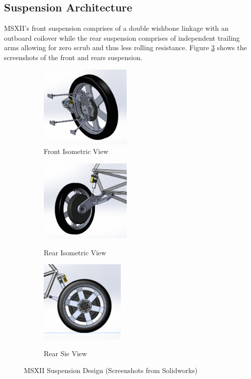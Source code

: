 \documentclass[12pt]{article}
\begin{document}
\subsection{Suspension Architecture}
MSXII's front suspension comprises of a double wishbone linkage with an outboard coilover while the rear suspension comprises of independent trailing arms allowing for zero scrub and thus less rolling resistance. Figure \ref{fig:solidworksScreenshots} shows the screenshots of the front and rears suspension.  
\begin{figure}[htbp]
	\centering
    \begin{subfigure}[b]{.32\textwidth}
		\caption{Front Isometric View}
		\centering
        \includegraphics[height=4cm]{./LaTex/frontIso.PNG}
    \end{subfigure}
    \begin{subfigure}[b]{.32\textwidth}
		\caption{Rear Isometric View}
		\centering
        \includegraphics[height=4cm]{./LaTex/rearIso.PNG}
        \label{fig:c8}
    \end{subfigure}
    \begin{subfigure}[b]{.32\textwidth}
		\caption{Rear Sie View}
		\centering
        \includegraphics[height=4cm]{./LaTex/rearRight.PNG}
        \label{fig:c9}
    \end{subfigure}
    \caption{MSXII Suspension Design (Screenshots from Solidworks)}
	\label{fig:solidworksScreenshots}
\end{figure}
	
\end{document}
